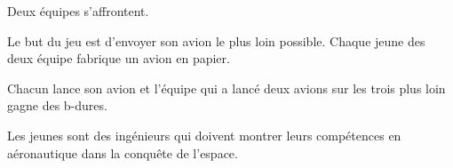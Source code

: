 \documentclass{grand-jeu}
\begin{document}
\begin{liste-materiel}
\end{liste-materiel}

\begin{regles}
Deux équipes s’affrontent.

Le but du jeu est d'envoyer son avion le plus loin possible. Chaque jeune des deux équipe fabrique un avion en papier. 

Chacun lance son avion et l'équipe qui a lancé deux avions sur les trois plus loin gagne des b-dures.
\end{regles}

\begin{imaginaire}
Les jeunes sont des ingénieurs qui doivent montrer leurs compétences en aéronautique dans la conquête de l'espace.
\end{imaginaire}

\begin{moments-stop}
\end{moments-stop}
\end{document}

